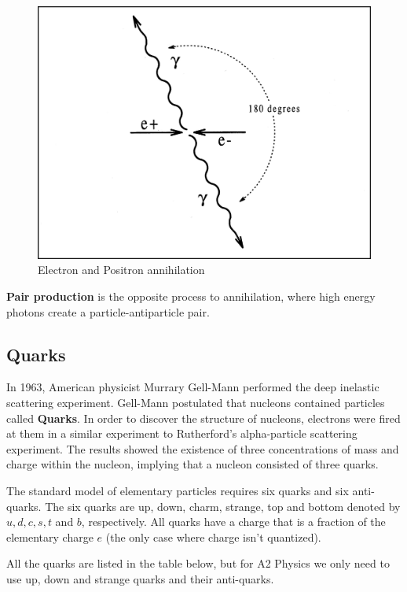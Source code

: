 \begin{figure}[h!]
    \centering
    \includegraphics[scale=0.15]{notes/images/Annihilation.JPG}
    \caption{Electron and Positron annihilation}
\end{figure}
\FloatBarrier

\textbf{Pair production} is the opposite process to annihilation, where high energy photons create a particle-antiparticle pair. 

\subsection{Quarks}

In 1963, American physicist Murrary Gell-Mann performed the deep inelastic scattering experiment. Gell-Mann postulated that nucleons contained particles called \textbf{Quarks}. In order to discover the structure of nucleons, electrons were fired at them in a similar experiment to Rutherford's alpha-particle scattering experiment. The results showed the existence of three concentrations of mass and charge within the nucleon, implying that a nucleon consisted of three quarks. 

The standard model of elementary particles requires six quarks and six anti-quarks. The six quarks are up, down, charm, strange, top and bottom denoted by $u, d, c, s, t$ and $b$, respectively. All quarks have a charge that is a fraction of the elementary charge $e$ (the only case where charge isn't quantized).

All the quarks are listed in the table below, but for A2 Physics we only need to use up, down and strange quarks and their anti-quarks. 


